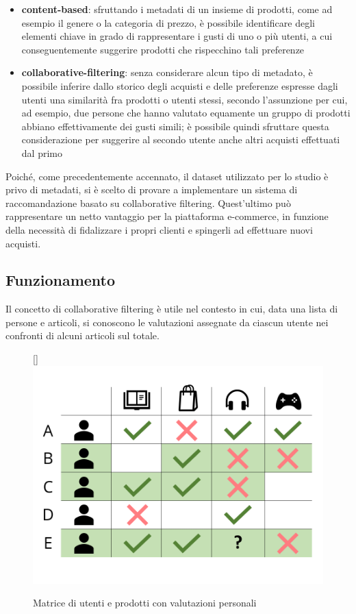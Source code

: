 \documentclass[hidelinks, 12pt]{article}
\begin{document}
\begin{itemize}
	\item \textbf{content-based}: sfruttando i metadati di un insieme di prodotti, come ad esempio il genere o la categoria di prezzo, è possibile identificare degli elementi chiave in grado di rappresentare i gusti di uno o più utenti, a cui conseguentemente suggerire prodotti che rispecchino tali preferenze
	\item \textbf{collaborative-filtering}: senza considerare alcun tipo di metadato, è possibile inferire dallo storico degli acquisti e delle preferenze espresse dagli utenti una similarità fra prodotti o utenti stessi, secondo l'assunzione per cui, ad esempio, due persone che hanno valutato equamente un gruppo di prodotti abbiano effettivamente dei gusti simili; è possibile quindi sfruttare questa considerazione per suggerire al secondo utente anche altri acquisti effettuati dal primo
\end{itemize}

Poiché, come precedentemente accennato, il dataset utilizzato per lo studio è privo di metadati, si è scelto di provare a implementare un sistema di raccomandazione basato su collaborative filtering. Quest'ultimo può rappresentare un netto vantaggio per la piattaforma e-commerce, in funzione della necessità di fidalizzare i propri clienti e spingerli ad effettuare nuovi acquisti.



\subsection{Funzionamento}

Il concetto di collaborative filtering è utile nel contesto in cui, data una lista di persone e articoli, si conoscono le valutazioni assegnate da ciascun utente nei confronti di alcuni articoli sul totale.

\begin{figure}
	\raisebox{0pt}[\dimexpr{}\baselineskip\relax]{\includegraphics[scale=0.4]{../images/07_01_collab_matrix.png}}
	\caption[Matrice di utenti e prodotti con valutazioni personali]{Matrice di utenti e prodotti con valutazioni personali}
	\label{fig:collab-filter-matrix}
\end{figure}
\end{document}
